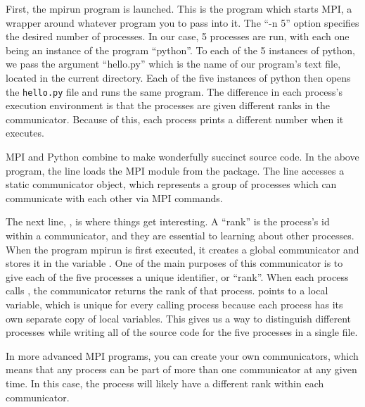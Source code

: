     First, the mpirun program is launched. This is the program which starts MPI, a wrapper around whatever program you to pass into it. The ``-n 5'' option specifies the desired number of processes. In our case, 5 processes are run, with each one being an instance of the program ``python''. To each of the 5 instances of python, we pass the argument ``hello.py'' which is the name of our program's text file, located in the current directory. Each of the five instances of python then opens the \texttt{hello.py} file and runs the same program. The difference in each process's execution environment is that the processes are given different ranks in the communicator. Because of this, each process prints a different number when it executes.

    MPI and Python combine to make wonderfully succinct source code. In the above program, the line  loads the MPI module from the  package. The line  accesses a static communicator object, which represents a group of processes which can communicate with each other via MPI commands.


    The next line, , is where things get interesting. A ``rank'' is the process's id within a communicator, and they are essential to learning about other processes. When the program mpirun is first executed, it creates a global communicator and stores it in the variable . One of the main purposes of this communicator is to give each of the five processes a unique identifier, or ``rank''. When each process calls , the communicator returns the rank of that process.  points to a local variable, which is unique for every calling process because each process has its own separate copy of local variables. This gives us a way to distinguish different processes while writing all of the source code for the five processes in a single file.

    In more advanced MPI programs, you can create your own communicators, which means that any process can be part of more than one communicator at any given time. In this case, the process will likely have a different rank within each communicator.
    

